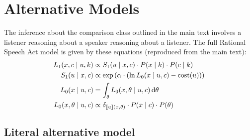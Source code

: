 \documentclass[doc]{apa6}
\begin{document}
\section{Alternative Models}




The inference about the comparison class outlined in the main text involves a listener reasoning about a speaker reasoning about a listener. The full Rational Speech Act model is given by these equations (reproduced from the main text): 
%
\begin{align}
L_1(x, c \mid u, k) &\propto S_1(u \mid x, c) \cdot P(x \mid k) \cdot P(c \mid k)  \label{eq:L1a} \\ 
S_1(u \mid x, c) &\propto \exp{(\alpha \cdot (\ln L_{0}(x \mid u, c) - \text{cost}(u) ))}\label{eq:S1} \\
L_{0}(x \mid u, c) &= \int_{\theta} L_{0}(x, \theta \mid u, c) \mathop{}\!\mathrm{d}\theta \label{eq:L0_marg} \\ 
L_{0}(x, \theta \mid u, c) &\propto {\delta_{[\![u]\!](x, \theta)} \cdot P(x \mid c)} \cdot P(\theta) \label{eq:L0}
\end{align}



\subsection{Literal alternative model}
\end{document}
